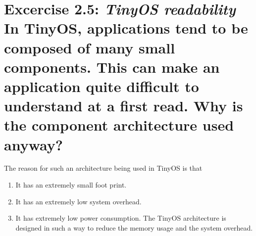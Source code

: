 \documentclass[11pt]{article} %
\begin{document}
\section*{Excercise 2.5: \textnormal{\large{\textit{TinyOS readability} In TinyOS, applications tend to be composed
of many small components. This can make an application quite difficult to understand at a first read. Why is the component architecture used anyway?}}}
The reason for such an architecture being used in TinyOS is that
\begin{enumerate}
\item It has an extremely small foot print.
\item It has an extremely low system overhead.
\item It has extremely low power consumption. The TinyOS architecture is designed in such a way to reduce the memory usage and the system overhead.
\end{enumerate}
\end{document}
